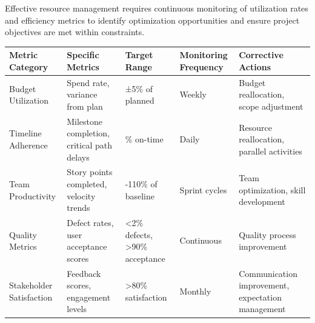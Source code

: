 \documentclass[
  letterpaper,
  DIV=11,
  numbers=noendperiod]{scrartcl}
\begin{document}
Effective resource management requires continuous monitoring of
utilization rates and efficiency metrics to identify optimization
opportunities and ensure project objectives are met within constraints.

\begin{longtable}[]{@{}
  >{\raggedright\arraybackslash}p{}
  >{\raggedright\arraybackslash}p{}
  >{\raggedright\arraybackslash}p{}
  >{\raggedright\arraybackslash}p{}
  >{\raggedright\arraybackslash}p{}@{}}
\toprule\noalign{}
\begin{minipage}[b]{\linewidth}\raggedright
Metric Category
\end{minipage} & \begin{minipage}[b]{\linewidth}\raggedright
Specific Metrics
\end{minipage} & \begin{minipage}[b]{\linewidth}\raggedright
Target Range
\end{minipage} & \begin{minipage}[b]{\linewidth}\raggedright
Monitoring Frequency
\end{minipage} & \begin{minipage}[b]{\linewidth}\raggedright
Corrective Actions
\end{minipage} \\
\midrule\noalign{}
\endhead
\bottomrule\noalign{}
\endlastfoot
Budget Utilization & Spend rate, variance from plan & ±5\% of planned &
Weekly & Budget reallocation, scope adjustment \\
Timeline Adherence & Milestone completion, critical path delays & 95\%
on-time & Daily & Resource reallocation, parallel activities \\
Team Productivity & Story points completed, velocity trends & 85-110\%
of baseline & Sprint cycles & Team optimization, skill development \\
Quality Metrics & Defect rates, user acceptance scores & \textless2\%
defects, \textgreater90\% acceptance & Continuous & Quality process
improvement \\
Stakeholder Satisfaction & Feedback scores, engagement levels &
\textgreater80\% satisfaction & Monthly & Communication improvement,
expectation management \\
\end{longtable}
\end{document}
